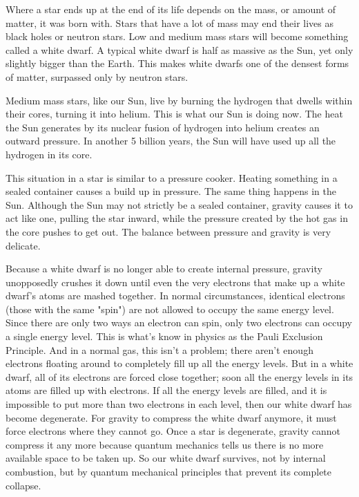 \documentclass[%
oneside,                 %
final,                   %
10pt]{article}
\begin{document}
Where a star ends up at the end of its life depends on the mass, or amount of matter, it was born with. 
Stars that have a lot of mass may end their lives as black holes or neutron stars. Low and medium mass stars 
will become something called a white dwarf. A typical white dwarf is half as massive as the Sun, yet 
only slightly bigger than the Earth. This makes white dwarfs one of the densest forms of matter, surpassed only by neutron stars.

Medium mass stars, like our Sun, live by burning the hydrogen that dwells within their cores, 
turning it into helium. This is what our Sun is doing now. The heat the Sun generates by its 
nuclear fusion of hydrogen into helium creates an outward pressure. In another 5 billion years, 
the Sun will have used up all the hydrogen in its core.

This situation in a star is similar to a pressure cooker. Heating something 
in a sealed container causes a build up in pressure. The same thing happens in the Sun. 
Although the Sun may not strictly be a sealed container, gravity causes it to act like one, pulling the 
star inward, while the pressure created by the hot gas in the core pushes to get out. 
The balance between pressure and gravity is very delicate. 

Because a white dwarf is no longer able to create internal pressure, gravity unopposedly crushes 
it down until even the very electrons that make up a white dwarf's atoms are mashed together. 
In normal circumstances, identical electrons (those with the same "spin") are not allowed to occupy the same energy level. 
Since there are only two ways an electron can spin, only two electrons can occupy a single energy level. 
This is what's know in physics as the Pauli Exclusion Principle. And in a normal gas, this isn't a problem; 
there aren't enough electrons floating around to completely fill up all the energy levels. But in a white dwarf, 
all of its electrons are forced close together; soon all the energy levels in its atoms are filled up with electrons. 
If all the energy levels are filled, and it is impossible to put more than two electrons in each level, 
then our white dwarf has become degenerate. For gravity to compress the white dwarf anymore, 
it must force electrons where they cannot go. Once a star is degenerate, gravity cannot compress it any more 
because quantum mechanics tells us there is no more available space to be taken up. So our white dwarf survives, 
not by internal combustion, but by quantum mechanical principles that prevent its complete collapse.
\end{document}
